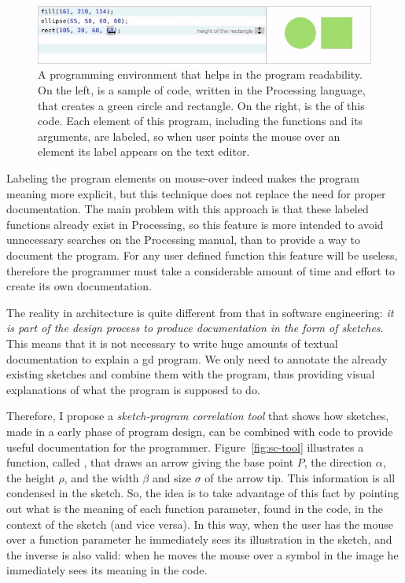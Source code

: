 \begin{figure}[!h]
  \centering
  \includegraphics[width=.7\textwidth]{images/victor-example}
    \caption{A programming environment that helps in the program readability. On the left, is a sample of code, written in the Processing language, that creates a green circle and rectangle. On the right, is the of this code. Each element of this program, including the functions and its arguments, are labeled, so when user points the mouse over an element its label appears on the text editor.}
  \label{fig:victor-ex}
\end{figure}

Labeling the program elements on mouse-over indeed makes the program meaning more explicit, but this technique does not replace the need for proper documentation. The main problem with this approach is that these labeled functions already exist in Processing, so this feature is more intended to avoid unnecessary searches on the Processing manual, than to provide a way to document the program. For any user defined function this feature will be useless, therefore the programmer must take a considerable amount of time and effort to create its own documentation.

The reality in architecture is quite different from that in software engineering: \textit{it is part of the design process to produce documentation in the form of sketches}. This means that it is not necessary to write huge amounts of textual documentation to explain a \gls{gd} program. We only need to annotate the already existing sketches and combine them with the program, thus providing visual explanations of what the program is supposed to do.

Therefore, I propose a \textit{sketch-program correlation tool} that shows how sketches, made in a early phase of program design, can be combined with code to provide useful documentation for the programmer. Figure~\ref{fig:sc-tool} illustrates a function, called , that draws an arrow giving the base point $P$, the direction $\alpha$, the height $\rho$, and the width $\beta$ and size $\sigma$ of the arrow tip. This information is all condensed in the sketch. So, the idea is to take advantage of this fact by pointing out what is the meaning of each function parameter, found in the code, in the context of the sketch (and vice versa). In this way, when the user has the mouse over a function parameter he immediately sees its illustration in the sketch, and  the inverse is also valid: when he moves the mouse over a symbol in the image he immediately sees its meaning in the code.

